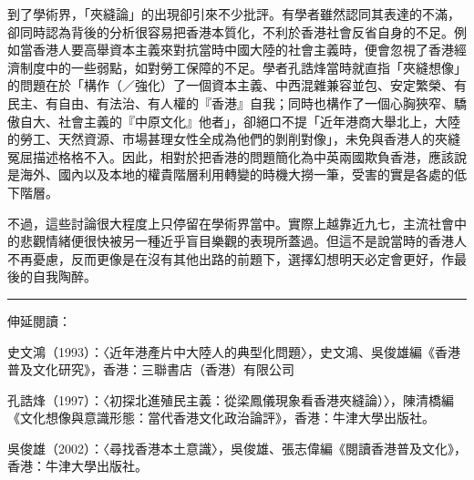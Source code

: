 
到了學術界，「夾縫論」的出現卻引來不少批評。有學者雖然認同其表達的不滿，卻同時認為背後的分析很容易把香港本質化，不利於香港社會反省自身的不足。例如當香港人要高舉資本主義來對抗當時中國大陸的社會主義時，便會忽視了香港經濟制度中的一些弱點，如對勞工保障的不足。學者孔誥烽當時就直指「夾縫想像」的問題在於「構作（／強化）了一個資本主義、中西混雜兼容並包、安定繁榮、有民主、有自由、有法治、有人權的『香港』自我；同時也構作了一個心胸狹窄、驕傲自大、社會主義的『中原文化』他者」，卻絕口不提「近年港商大舉北上，大陸的勞工、天然資源、市場甚理女性全成為他們的剝削對像」，未免與香港人的夾縫冤屈描述格格不入。因此，相對於把香港的問題簡化為中英兩國欺負香港，應該說是海外、國內以及本地的權貴階層利用轉變的時機大撈一筆，受害的實是各處的低下階層。

不過，這些討論很大程度上只停留在學術界當中。實際上越靠近九七，主流社會中的悲觀情緒便很快被另一種近乎盲目樂觀的表現所蓋過。但這不是說當時的香港人不再憂慮，反而更像是在沒有其他出路的前題下，選擇幻想明天必定會更好，作最後的自我陶醉。

\rule[-10pt]{15cm}{0.05em}

伸延閱讀：

史文鴻（1993）：〈近年港產片中大陸人的典型化問題〉，史文鴻、吳俊雄編《香港普及文化研究》，香港：三聯書店（香港）有限公司

孔誥烽（1997）：〈初探北進殖民主義：從梁鳳儀現象看香港夾縫論）〉，陳清橋編《文化想像與意識形態：當代香港文化政治論評》，香港：牛津大學出版社。

吳俊雄（2002）：〈尋找香港本土意識〉，吳俊雄、張志偉編《閱讀香港普及文化》，香港：牛津大學出版社。